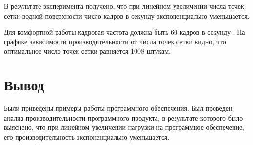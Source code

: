 В результате эксперимента получено, что при линейном увеличении числа точек сетки водной поверхности число кадров в секунду экспоненциально уменьшается. 

Для комфортной работы кадровая частота должна быть 60 кадров в секунду \cite{fps}. На графике зависимости производительности от числа точек сетки видно, что оптимальное число точек сетки равняется 1008 штукам.

\section*{Вывод}

Были приведены примеры работы программного обеспечения. Был проведен анализ производительности программного продукта, в результате которого было выяснено, что при линейном увеличении нагрузки на программное обеспечение, его производительность экспоненциально уменьшается.